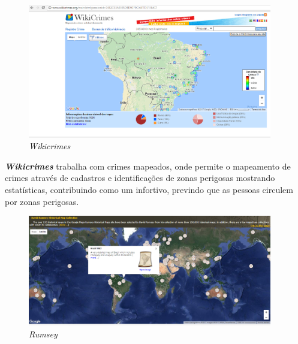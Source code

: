 \documentclass[
	12pt,				%
    oneside,			%
	a4paper,			%
	english,			%
	french,				%
	spanish,			%
	brazil,				%
	]{abntex2}
\begin{document}
\begin{figure} [H] 
\label{figura1} 
\caption{\textit{Wikicrimes}}
\includegraphics[width=0.95\textwidth]{wikicrimes.png} %
\end{figure}

\textit{\textbf{Wikicrimes}} trabalha com crimes mapeados, onde permite o mapeamento de crimes através de cadastros e identificações de zonas perigosas mostrando estatísticas, contribuindo como um infortivo, previndo que as pessoas circulem por zonas perigosas.

\begin{figure} [H] 
\label{figura1} 
\caption{\textit{Rumsey}}
\includegraphics[width=0.95\textwidth]{rumsey.png} %
\end{figure}
\end{document}
